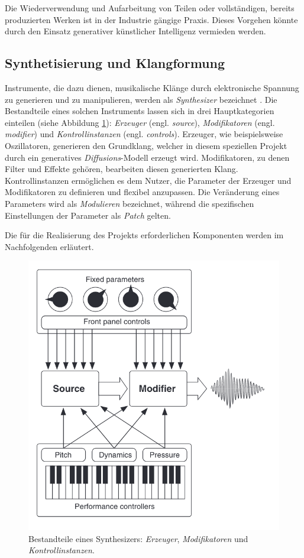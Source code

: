 \documentclass[
  a4paper,  %
  twoside,  %
  bibliography=totoc,
  headsepline,
  cleardoublepage=empty,
  parskip=half,
  draft=false
]{scrbook}
\begin{document}
Die Wiederverwendung und Aufarbeitung von Teilen oder vollständigen, bereits produzierten Werken ist in der Industrie gängige Praxis. Dieses Vorgehen könnte durch den Einsatz generativer künstlicher Intelligenz vermieden werden.

\subsection{Synthetisierung und Klangformung} \label{sec:synth+envelope}

Instrumente, die dazu dienen, musikalische Klänge durch elektronische Spannung zu generieren und zu manipulieren, werden als \emph{Synthesizer} bezeichnet \cite{dudenredaktion_synthesizer_nodate, pirkle_designing_2021}. Die Bestandteile eines solchen Instruments lassen sich in drei Hauptkategorien einteilen (siehe Abbildung \ref{fig:synth}): \emph{Erzeuger} (engl. \emph{source}), \emph{Modifikatoren} (engl. \emph{modifier}) und \emph{Kontrollinstanzen} (engl. \emph{controls}). Erzeuger, wie beispielsweise Oszillatoren, generieren den Grundklang, welcher in diesem speziellen Projekt durch ein generatives \emph{Diffusions}-Modell erzeugt wird. Modifikatoren, zu denen Filter und Effekte gehören, bearbeiten diesen generierten Klang. Kontrollinstanzen ermöglichen es dem Nutzer, die Parameter der Erzeuger und Modifikatoren zu definieren und flexibel anzupassen. Die Veränderung eines Parameters wird als \emph{Modulieren} bezeichnet, während die spezifischen Einstellungen der Parameter als \emph{Patch} gelten. \cite{pirkle_designing_2021}   

Die für die Realisierung des Projekts erforderlichen Komponenten werden im Nachfolgenden erläutert.

\begin{figure}[h]
  \centering
  \includegraphics[width=.5\textwidth]{graphics/synthstruc.png}
  \caption[Synth]{Bestandteile eines Synthesizers: \emph{Erzeuger}, \emph{Modifikatoren} und \emph{Kontrollinstanzen}. \cite{russ_sound_2009}}
  \label{fig:synth}
\end{figure}
\end{document}
